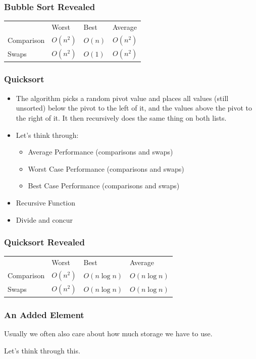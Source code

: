 \documentclass[11pt]{article}
\begin{document}
\subsubsection{Bubble Sort Revealed}
\label{sec:org859214e}
\begin{center}
\begin{tabular}{llll}
 & Worst & Best & Average\\
Comparison & \(O(n^2)\) & \(O(n)\) & \(O(n^2)\)\\
Swaps & \(O(n^2)\) & \(O(1)\) & \(O(n^2)\)\\
\end{tabular}
\end{center}
\subsubsection{Quicksort}
\label{sec:org1ab29ab}
\begin{itemize}
\item The algorithm picks a random pivot value and places all values (still unsorted) below the pivot to the left of it, and the values above the pivot to the right of it.  It then recursively does the same thing on both lists.
\item Let's think through:
\begin{itemize}
\item Average Performance (comparisons and swaps)
\item Worst Case Performance (comparisons and swaps)
\item Best Case Performance (comparisons and swaps)
\end{itemize}
\item Recursive Function
\item Divide and concur
\end{itemize}
\subsubsection{Quicksort Revealed}
\label{sec:orgc9028f2}
\begin{center}
\begin{tabular}{llll}
 & Worst & Best & Average\\
Comparison & \(O(n^2)\) & \(O(n \log n)\) & \(O(n \log n)\)\\
Swaps & \(O(n^2)\) & \(O(n \log n)\) & \(O(n \log n)\)\\
\end{tabular}
\end{center}
\subsubsection{An Added Element}
\label{sec:org542f3d4}
Usually we often also care about how much storage we have to use.

Let's think through this.
\end{document}
